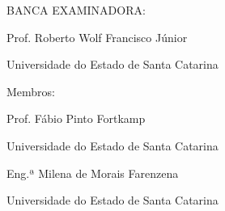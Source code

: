 

%
% 
%
\begin{folhadeaprovacao}



	\begin{center}
		{\selectfont\MakeTextUppercase{\normalsize\imprimirautor}}
	\end{center}
    \vfill
    
	\vfill
	\begin{center}
		{\selectfont\MakeTextUppercase{\imprimirtitulo}}
	\end{center}
	\vfill

    
%


\vfill
        
	 \begin{center}
	 	
    	{\selectfont BANCA EXAMINADORA: }
    	\vspace*{1.75cm}
    
		Prof. Roberto Wolf Francisco Júnior \par
		Universidade do Estado de Santa Catarina
	 \end{center}
	
    {Membros:} 
    
	\begin{center}
		\vspace*{1.25cm}
		Prof. Fábio Pinto Fortkamp \par
		Universidade do Estado de Santa Catarina
		
		\vspace*{1.25cm}
		Eng.ª Milena de Morais Farenzena \par
		Universidade do Estado de Santa Catarina
		

\end{center}
\end{folhadeaprovacao}

